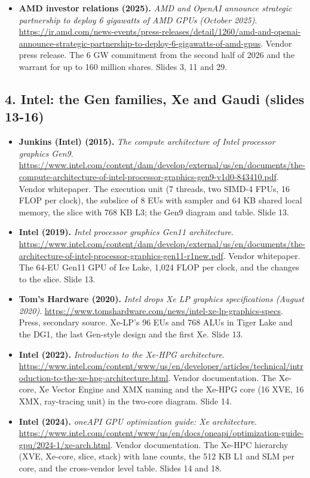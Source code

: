 \documentclass[11pt,letterpaper]{article}
\begin{document}
\begin{itemize}[leftmargin=1.2em,itemsep=3pt]
\item \textbf{AMD investor relations (2025).} \textit{AMD and OpenAI announce strategic partnership to deploy 6 gigawatts of AMD GPUs (October 2025)}. \url{https://ir.amd.com/news-events/press-releases/detail/1260/amd-and-openai-announce-strategic-partnership-to-deploy-6-gigawatts-of-amd-gpus}. Vendor press release. The 6 GW commitment from the second half of 2026 and the warrant for up to 160 million shares. Slides 3, 11 and 29.
\end{itemize}
\subsection*{4. Intel: the Gen families, Xe and Gaudi (slides 13-16)}
\begin{itemize}[leftmargin=1.2em,itemsep=3pt]\sloppy
\item \textbf{Junkins (Intel) (2015).} \textit{The compute architecture of Intel processor graphics Gen9}. \url{https://www.intel.com/content/dam/develop/external/us/en/documents/the-compute-architecture-of-intel-processor-graphics-gen9-v1d0-843410.pdf}. Vendor whitepaper. The execution unit (7 threads, two SIMD-4 FPUs, 16 FLOP per clock), the subslice of 8 EUs with sampler and 64 KB shared local memory, the slice with 768 KB L3; the Gen9 diagram and table. Slide 13.
\item \textbf{Intel (2019).} \textit{Intel processor graphics Gen11 architecture}. \url{https://www.intel.com/content/dam/develop/external/us/en/documents/the-architecture-of-intel-processor-graphics-gen11-r1new.pdf}. Vendor whitepaper. The 64-EU Gen11 GPU of Ice Lake, 1,024 FLOP per clock, and the changes to the slice. Slide 13.
\item \textbf{Tom's Hardware (2020).} \textit{Intel drops Xe LP graphics specifications (August 2020)}. \url{https://www.tomshardware.com/news/intel-xe-lp-graphics-specs}. Press, secondary source. Xe-LP's 96 EUs and 768 ALUs in Tiger Lake and the DG1, the last Gen-style design and the first Xe. Slide 13.
\item \textbf{Intel (2022).} \textit{Introduction to the Xe-HPG architecture}. \url{https://www.intel.com/content/www/us/en/developer/articles/technical/introduction-to-the-xe-hpg-architecture.html}. Vendor documentation. The Xe-core, Xe Vector Engine and XMX naming and the Xe-HPG core (16 XVE, 16 XMX, ray-tracing unit) in the two-core diagram. Slide 14.
\item \textbf{Intel (2024).} \textit{oneAPI GPU optimization guide: Xe architecture}. \url{https://www.intel.com/content/www/us/en/docs/oneapi/optimization-guide-gpu/2024-1/xe-arch.html}. Vendor documentation. The Xe-HPC hierarchy (XVE, Xe-core, slice, stack) with lane counts, the 512 KB L1 and SLM per core, and the cross-vendor level table. Slides 14 and 18.

\end{itemize}
\end{document}
